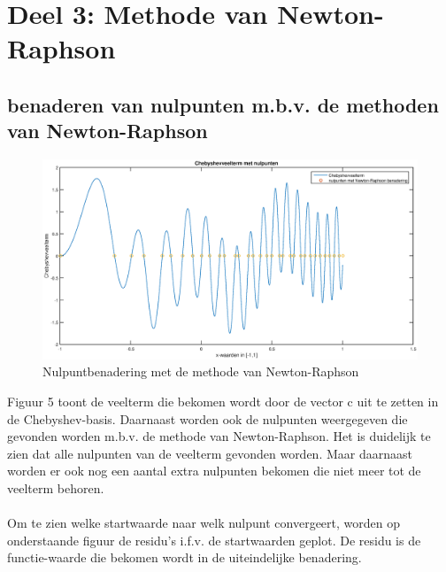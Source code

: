 \documentclass{article}
\begin{document}
\clearpage


\section{Deel 3: Methode van Newton-Raphson}

\subsection{benaderen van nulpunten m.b.v. de methoden van Newton-Raphson}

\begin{center}
\begin{figure}[h!]
\includegraphics[width=0.75\columnwidth]{figuur_1}
\caption{Nulpuntbenadering met de methode van Newton-Raphson} %
\end{figure}
\end{center}
Figuur 5 toont de veelterm die bekomen wordt door de vector c uit te zetten in de Chebyshev-basis. Daarnaast worden ook de nulpunten weergegeven die gevonden worden m.b.v. de methode van Newton-Raphson. Het is duidelijk te zien dat alle nulpunten van de veelterm gevonden worden. Maar daarnaast worden er ook nog een aantal extra nulpunten bekomen die niet meer tot de veelterm behoren.
\\ \\
Om te zien welke startwaarde naar welk nulpunt convergeert, worden op onderstaande figuur de residu’s i.f.v. de startwaarden geplot. De residu is de functie-waarde die bekomen wordt in de uiteindelijke benadering.
\\ \\
\end{document}
